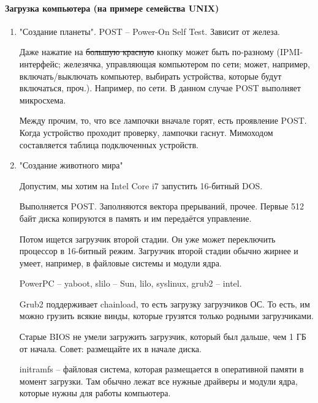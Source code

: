 \documentclass[a4paper,10pt]{article}
\begin{document}
\paragraph{Загрузка компьютера (на примере семейства UNIX)}
\begin{enumerate}
\item "Создание планеты".
POST -- Power-On Self Test. Зависит от железа.

Даже нажатие на \sout{большую красную} кнопку может быть по-разному (IPMI-интерфейс; железячка, управляющая компьютером по сети; может, например, включать/выключать компьютер, выбирать устройства, которые будут включаться, проч.). Например, по сети.
В данном случае POST выполняет микросхема.

Между прочим, то, что все лампочки вначале горят, есть проявление POST. Когда устройство проходит проверку, лампочки гаснут. Мимоходом составляется таблица подключенных устройств.

\item "Создание животного мира"

Допустим, мы хотим на Intel Core i7 запустить 16-битный DOS.

Выполняется POST. Заполняются вектора прерываний, прочее. Первые 512 байт диска копируются в память и им передаётся управление. 

Потом ищется загрузчик второй стадии. Он уже может переключить процессор в 16-битный режим. Загрузчик второй стадии обычно жирнее и умеет, например, в файловые системы и модули ядра.

PowerPC -- yaboot, slilo -- Sun, lilo, syslinux, grub2 -- intel.

Grub2 поддерживает chainload, то есть загрузку загрузчиков ОС. То есть, им можно грузить всякие винды, которые грузятся только родными загрузчиками.

Старые BIOS не умели загружить загрузчик, который был дальше, чем 1 ГБ от начала. Совет: размещайте их в начале диска.

initramfs -- файловая система, которая размещается в оперативной памяти в момент загрузки. Там обычно лежат все нужные драйверы и модули ядра, которые нужны для работы компьютера.


\end{enumerate}
\end{document}
